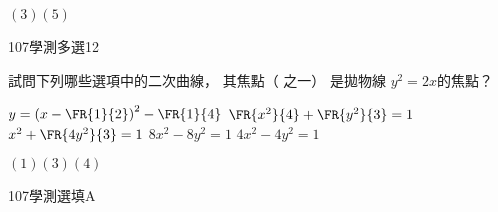 \begin{QUESTIONS}
\begin{QUESTION}
        \begin{QANS}
            $(3)(5)$
        \end{QANS}
        \begin{QSOLLIST}
        \end{QSOLLIST}
        \begin{QEMPTYSPACE}
        \end{QEMPTYSPACE}
    \end{QUESTION}
    \begin{QUESTION}
        \begin{ExamInfo}{107}{學測}{多選}{12}
        \end{ExamInfo}
        \begin{ExamAnsRateInfo}{}{}{}{}
        \end{ExamAnsRateInfo}
        \begin{QBODY}
            試問下列哪些選項中的二次曲線， 其焦點（ 之一） 是拋物線 $y^2=2x$的焦點？
            \begin{QOPS}
                \QOP $y = \left(x-\FR{1}{2}\right)^2 - \FR{1}{4}$
                \QOP $\FR{x^2}{4} + \FR{y^2}{3} = 1 $
                \QOP $x^2 + \FR{4y^2}{3} = 1 $
                \QOP $8x^2 - 8y^2 = 1 $
                \QOP $4x^2 - 4y^2 = 1 $
            \end{QOPS}
        \end{QBODY}
        \begin{QFROMS}
        \end{QFROMS}
        \begin{QTAGS}\end{QTAGS}
        \begin{QANS}
            $(1)(3)(4)$
        \end{QANS}
        \begin{QSOLLIST}
        \end{QSOLLIST}
        \begin{QEMPTYSPACE}
        \end{QEMPTYSPACE}
    \end{QUESTION}
\end{QUESTIONS}\begin{QUESTIONS}
    \begin{QUESTION}
        \begin{ExamInfo}{107}{學測}{選填}{A}
        \end{ExamInfo}
        \begin{ExamAnsRateInfo}{}{}{}{}
        \end{ExamAnsRateInfo}
        \begin{QBODY}

\end{QBODY}
\end{QUESTION}
\end{QUESTIONS}
